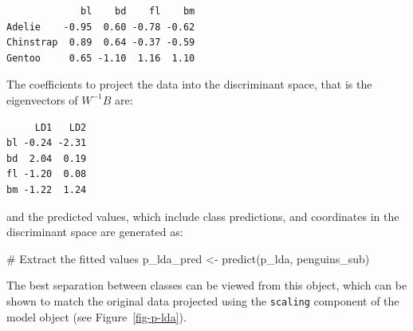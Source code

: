 \documentclass[
  letterpaper,
]{krantz}
\newenvironment{Shaded}{\begin{snugshade}}{\end{snugshade}}
\newcommand{\CommentTok}[1]{\textcolor[rgb]{0.37,0.37,0.37}{#1}}
\newcommand{\FunctionTok}[1]{\textcolor[rgb]{0.28,0.35,0.67}{#1}}
\newcommand{\NormalTok}[1]{\textcolor[rgb]{0.00,0.23,0.31}{#1}}
\newcommand{\OtherTok}[1]{\textcolor[rgb]{0.00,0.23,0.31}{#1}}
\newcommand{\SpecialCharTok}[1]{\textcolor[rgb]{0.37,0.37,0.37}{#1}}
\begin{document}
\begin{verbatim}
             bl    bd    fl    bm
Adelie    -0.95  0.60 -0.78 -0.62
Chinstrap  0.89  0.64 -0.37 -0.59
Gentoo     0.65 -1.10  1.16  1.10
\end{verbatim}

The coefficients to project the data into the discriminant space, that
is the eigenvectors of \(W^{-1}B\) are:

\begin{Shaded}
\end{Shaded}

\begin{verbatim}
     LD1   LD2
bl -0.24 -2.31
bd  2.04  0.19
fl -1.20  0.08
bm -1.22  1.24
\end{verbatim}

and the predicted values, which include class predictions, and
coordinates in the discriminant space are generated as:

\begin{Shaded}
\begin{Highlighting}[]
\CommentTok{\# Extract the fitted values}
\NormalTok{p\_lda\_pred }\OtherTok{\textless{}{-}} \FunctionTok{predict}\NormalTok{(p\_lda, penguins\_sub)}
\end{Highlighting}
\end{Shaded}

The best separation between classes can be viewed from this object,
which can be shown to match the original data projected using the
\texttt{scaling} component of the model object (see
Figure~\ref{fig-p-lda}).

 
 
\end{document}
